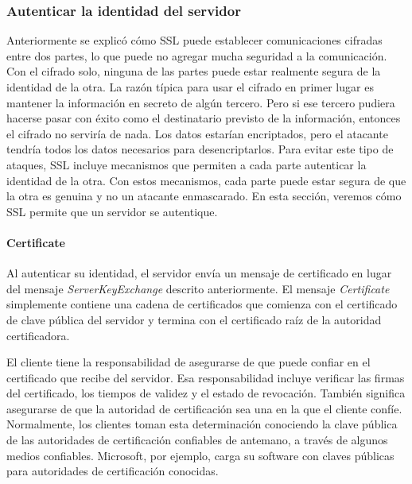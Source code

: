 \subsubsection*{Autenticar la identidad del servidor}
Anteriormente se explicó cómo SSL puede establecer comunicaciones 
cifradas entre dos partes, lo que puede no agregar mucha seguridad a 
la comunicación. Con el cifrado solo, ninguna de las partes puede 
estar realmente segura de la identidad de la otra. La razón típica 
para usar el cifrado en primer lugar es mantener la información en 
secreto de algún tercero. Pero si ese tercero pudiera hacerse pasar 
con éxito como el destinatario previsto de la información, entonces el 
cifrado no serviría de nada. Los datos estarían encriptados, pero el 
atacante tendría todos los datos necesarios para desencriptarlos. Para 
evitar este tipo de ataques, SSL incluye mecanismos que permiten a cada 
parte autenticar la identidad de la otra. Con estos mecanismos, cada 
parte puede estar segura de que la otra es genuina y no un atacante 
enmascarado. En esta sección, veremos cómo SSL permite que un servidor 
se autentique.

\paragraph*{Certificate}
Al autenticar su identidad, el servidor envía un mensaje de certificado 
en lugar del mensaje \emph{ServerKeyExchange} descrito anteriormente. El mensaje 
\emph{Certificate} simplemente contiene una cadena de certificados que comienza 
con el certificado de clave pública del servidor y termina con el certificado 
raíz de la autoridad certificadora.

El cliente tiene la responsabilidad de asegurarse de que puede confiar 
en el certificado que recibe del servidor. Esa responsabilidad incluye 
verificar las firmas del certificado, los tiempos de validez y el estado 
de revocación. También significa asegurarse de que la autoridad de 
certificación sea una en la que el cliente confíe. Normalmente, los clientes 
toman esta determinación conociendo la clave pública de las autoridades de 
certificación confiables de antemano, a través de algunos medios confiables. 
Microsoft, por ejemplo, carga su software con claves públicas para 
autoridades de certificación conocidas.

